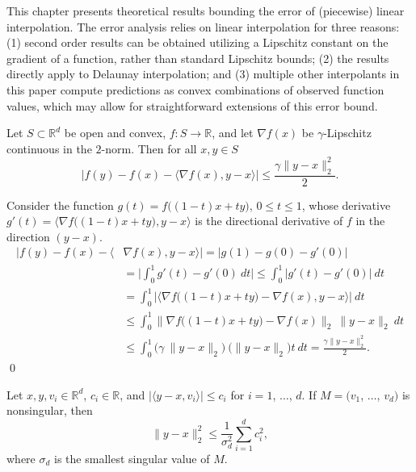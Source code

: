 
This chapter presents theoretical results bounding the error of
(piecewise) linear interpolation. The error analysis relies on linear
interpolation for three reasons: (1) second order results can be
obtained utilizing a Lipschitz constant on the gradient of a function,
rather than standard Lipschitz bounds; (2) the results directly apply
to Delaunay interpolation; and (3) multiple other interpolants in this
paper compute predictions as convex combinations of observed function
values, which may allow for straightforward extensions of this error
bound.

\begin{plainlemma}
  \label{lemma:1}
  Let $S \subset \mathbb{R}^d$ be open and convex, $f: S \rightarrow
  \mathbb{R}$, and let $\nabla f(x)$ be $\gamma$-Lipschitz continuous
  in the $2$-norm. Then for all $x,y \in S$
  $$\big|f(y) - f(x) - \langle \nabla f(x), y - x \rangle \big| \leq \frac{\gamma \|y - x\|_2^2}{2}.$$
\end{plainlemma}

\begin{proofdot}
  Consider the function $g(t) = f \big((1-t) x + t y \big)$, $0 \leq t
  \leq 1$, whose derivative $g'(t) = \big\langle \nabla f \big((1-t) x
  + t y \big), y - x \big\rangle$ is the directional derivative of $f$
  in the direction $(y - x).$
  \begin{align*}
    \big|f(y) - f(x) - \langle &\nabla f(x), y - x \rangle \big|
        = \big|g(1) - g(0) - g'(0) \big| \\
       &= \bigg| \int_0^1 g'(t) - g'(0)\ dt \bigg| \leq \int_0^1 \big|g'(t) - g'(0)\big|\ dt \\
       &= \int_0^1 \bigg| \big \langle \nabla f\big((1-t)x + ty\big) - \nabla f(x), y - x \big \rangle \bigg|\ dt \\
       &\leq \int_0^1 \big \| \nabla f\big((1-t)x + ty\big) - \nabla f(x) \big \|_2\ \| y - x \|_2\ dt \\
       &\leq \int_0^1 \big ( \gamma\ \|y-x\|_2 \big) \ \big( \|y-x\|_2 \big) t\ dt = \frac{\gamma \|y - x\|_2^2}{2}.
  \end{align*}
  \qed
\end{proofdot}

\hfill

\begin{plainlemma}
  \label{lemma:2}
  Let $x, y, v_i \in \mathbb{R}^d$, $c_i \in \mathbb{R}$, and
  $|\langle y - x, v_i \rangle| \leq c_i$ for $i = 1$, $\ldots$, $d.$
  If $M = (v_1$, $\ldots$, $v_d)$ is nonsingular, then
  $$\|y - x\|_2^2 \leq \frac{1}{\sigma_d^2} \sum_{i=1}^d c_i^2,$$
  where $\sigma_d$ is the smallest singular value of $M.$
\end{plainlemma}

